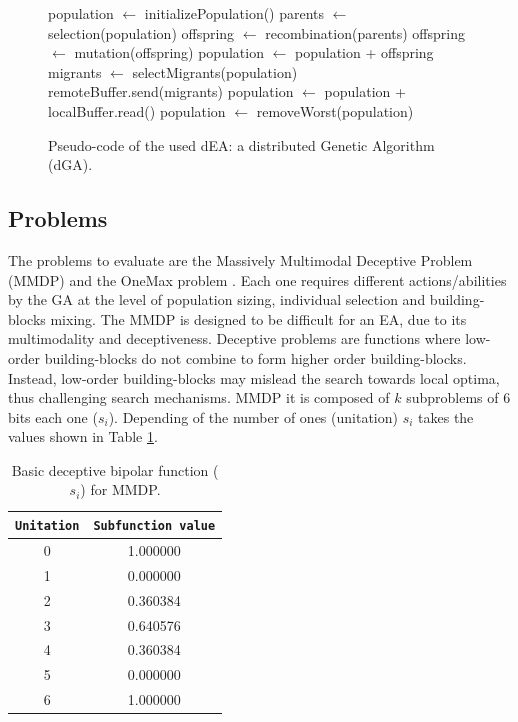 \documentclass[final,1p,times]{elsarticle}
\begin{document}
\begin{figure}[htb]

\begin{algorithmic}
\STATE population $\gets$ initializePopulation()
    \STATE parents $\gets$ selection(population)
    \STATE offspring $\gets$ recombination(parents)
    \STATE offspring $\gets$ mutation(offspring)
    \STATE population $\gets$ population + offspring
      \STATE migrants $\gets$ selectMigrants(population)
      \STATE remoteBuffer.send(migrants)
    \ENDIF
      \STATE population $\gets$ population + localBuffer.read()
    \ENDIF
    \STATE population $\gets$ removeWorst(population)
\ENDWHILE

\end{algorithmic}
\caption{Pseudo-code of the used dEA: a distributed Genetic Algorithm (dGA).}
\label{fig:EA}
\end{figure}




\subsection{Problems}
The problems to evaluate are the Massively Multimodal Deceptive Problem (MMDP) \cite{goldberg92massive} and the OneMax problem \cite{ONEMAX}. Each one requires different actions/abilities by the GA at the level of population sizing, individual selection and building-blocks mixing. The MMDP
 is designed to be difficult for an EA, due to
its multimodality and deceptiveness. Deceptive problems are functions where low-order building-blocks do not combine to form higher order building-blocks. Instead, low-order building-blocks may mislead the search towards local optima, thus challenging search mechanisms. MMDP it is composed of $k$ subproblems of 6 bits each one ($s_i$). Depending of
the number of ones (unitation) $s_i$ takes the values shown in Table \ref{table:mmdpvalues}.  

\begin{table}

\centering
{%
\caption{ Basic deceptive bipolar function ($s_i$) for MMDP.}
\label{table:mmdpvalues}
\begin{tabular}{|c|c|}
\hline
\texttt{Unitation}&\texttt{Subfunction value}\\
\hline
0 & 1.000000 \\
\hline
1 & 0.000000 \\
\hline
2 & 0.360384 \\
\hline
3 & 0.640576\\
\hline
4 & 0.360384\\
\hline
5 & 0.000000\\
\hline
6 & 1.000000\\
\hline

\end{tabular}
}


\end{table}
\end{document}
